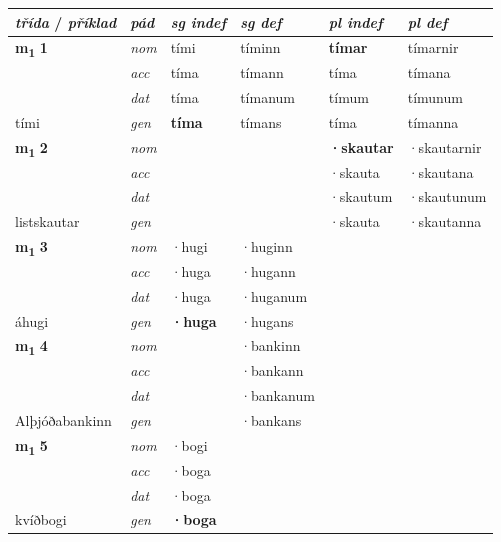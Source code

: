 \begin{longtable}[l]{X>{\footnotesize\itshape}XXXXX}

\toprule
 {\textbf{\textit{třída}} / \textit{příklad}}  &  {\textit{pád}}  & {\textit{sg indef}}  & {\textit{sg def}}    & {\textit{pl indef}} & {\textit{pl def}}\\ \cmidrule{1-6}
\endhead


\multirow{3}{*}{{{\textbf{m{\textsubscript{1}}} \Large{\textbf{1}}}}}  
 & nom & tími & tíminn    & \textbf{tímar} & tímarnir  \\*
 & acc & tíma  & tímann   & tíma  & tímana \\*
 & dat & tíma & tímanum   & tímum & tímunum \\*
 {\footnotesize{tími}} &  gen & \textbf{tíma}  & tímans  & tíma & tímanna \\
\cmidrule{1-6}


\multirow{3}{*}{{{\textbf{m{\textsubscript{1}}} \Large{\textbf{2}}}}}  
 & nom &  &     & \textbf{·skautar} & ·skautarnir  \\*
 & acc &   &    & ·skauta  & ·skautana \\*
 & dat &  &    & ·skautum & ·skautunum \\*
 {\footnotesize{listskautar}} &  gen & \textbf{}  &   & ·skauta & ·skautanna \\
\cmidrule{1-6}


\multirow{3}{*}{{{\textbf{m{\textsubscript{1}}} \Large{\textbf{3}}}}}  
 & nom & ·hugi & ·huginn    & \textbf{} &   \\*
 & acc & ·huga  & ·hugann   &   &  \\*
 & dat & ·huga & ·huganum   &  &  \\*
 {\footnotesize{áhugi}} &  gen & \textbf{·huga}  & ·hugans  &  &  \\
\cmidrule{1-6}


\multirow{3}{*}{{{\textbf{m{\textsubscript{1}}} \Large{\textbf{4}}}}}  
 & nom &  & ·bankinn    & \textbf{} &   \\*
 & acc &   & ·bankann   &   &  \\*
 & dat &  & ·bankanum   &  &  \\*
 {\footnotesize{Alþjóðabankinn}} &  gen & \textbf{}  & ·bankans  &  &  \\
\cmidrule{1-6}


\multirow{3}{*}{{{\textbf{m{\textsubscript{1}}} \Large{\textbf{5}}}}}  
 & nom & ·bogi &     & \textbf{} &   \\*
 & acc & ·boga  &    &   &  \\*
 & dat & ·boga &    &  &  \\*
 {\footnotesize{kvíðbogi}} &  gen & \textbf{·boga}  &   &  &  \\
\cmidrule{1-6}



\end{longtable}
